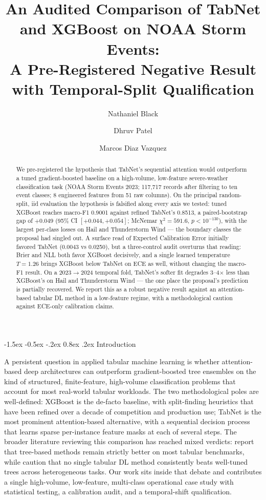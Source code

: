 \documentclass[11pt]{article}
\title{An Audited Comparison of TabNet and XGBoost on NOAA Storm Events:\\
       A Pre-Registered Negative Result with Temporal-Split Qualification}
\author{Nathaniel Black \and Dhruv Patel \and Marcos Diaz Vazquez}
\date{}
\makeatletter
\renewcommand\section{\@startsection{section}{1}{\z@}%
  {-1.5ex \@plus -0.5ex \@minus -.2ex}%
  {0.8ex \@plus.2ex}%
  {\normalfont\large\bfseries}}
\newcommand{\mF}{macro-F1}
\makeatother
\begin{document}
\maketitle

\begin{abstract}
We pre-registered the hypothesis that TabNet's sequential attention
would outperform a tuned gradient-boosted baseline on a high-volume,
low-feature severe-weather classification task (NOAA Storm Events
2023; 117{,}717 records after filtering to ten event classes; 8
engineered features from 51 raw columns). On the principal
random-split, iid evaluation the hypothesis is falsified along every
axis we tested: tuned XGBoost reaches \mF{} 0.9001 against refined
TabNet's 0.8513, a paired-bootstrap gap of $+0.049$ (95\% CI
$[+0.044, +0.054]$; McNemar $\chi^2 = 591.6$, $p < 10^{-130}$),
with the largest per-class losses on Hail and Thunderstorm Wind ---
the boundary classes the proposal had singled out. A surface read
of Expected Calibration Error initially favored TabNet (0.0043 vs
0.0250), but a three-control audit overturns that reading: Brier and
NLL both favor XGBoost decisively, and a single learned temperature
$T = 1.26$ brings XGBoost below TabNet on ECE as well, without
changing the \mF{} result. On a 2023$\rightarrow$2024 temporal fold,
TabNet's softer fit degrades 3--4$\times$ less than XGBoost's on
Hail and Thunderstorm Wind --- the one place the proposal's prediction
is partially recovered. We report this as a robust negative result
against an attention-based tabular DL method in a low-feature regime,
with a methodological caution against ECE-only calibration claims.
\end{abstract}

\section{Introduction}\label{sec:intro}

A persistent question in applied tabular machine learning is whether
attention-based deep architectures can outperform gradient-boosted
tree ensembles on the kind of structured, finite-feature,
high-volume classification problems that account for most real-world
tabular workloads. The two methodological poles are well-defined:
XGBoost \citep{chen2016xgboost} is the de-facto baseline, with
split-finding heuristics that have been refined over a decade of
competition and production use; TabNet \citep{arik2021tabnet} is the
most prominent attention-based alternative, with a sequential
decision process that learns sparse per-instance feature masks at
each of several steps. The broader literature reviewing this
comparison has reached mixed verdicts: \citet{grinsztajn2022why}
report that tree-based methods remain strictly better on most
tabular benchmarks, while \citet{shwartz2022tabular} caution that no
single tabular DL method consistently beats well-tuned trees across
heterogeneous tasks. Our work sits inside that debate and
contributes a single high-volume, low-feature, multi-class
operational case study with statistical testing, a calibration
audit, and a temporal-shift qualification.
\end{document}
